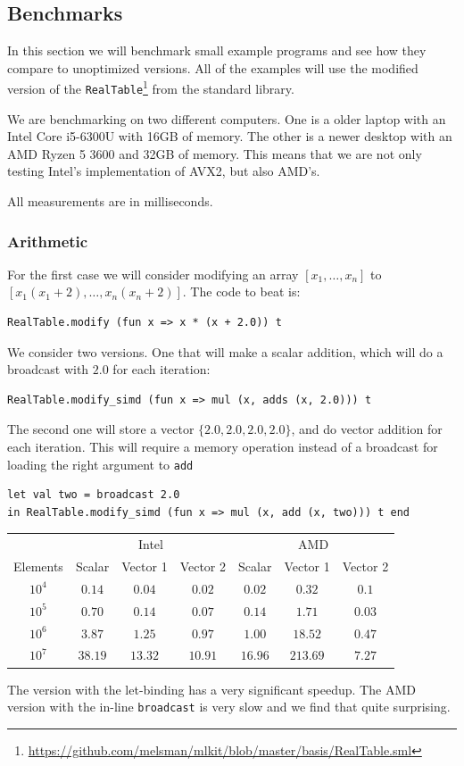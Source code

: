 \documentclass{article}
\begin{document}
\subsection{Benchmarks}

In this section we will benchmark small example programs and see how they compare to unoptimized versions. All of the examples will use the modified version of the \texttt{RealTable}\footnote{\url{https://github.com/melsman/mlkit/blob/master/basis/RealTable.sml}} from the standard library.
 
We are benchmarking on two different computers. One is a older laptop with an Intel Core i5-6300U with 16GB of memory. The other is a newer desktop with an AMD Ryzen 5 3600 and 32GB of memory. This means that we are not only testing Intel's implementation of AVX2, but also AMD's.

All measurements are in milliseconds.

\subsubsection{Arithmetic}

For the first case we will consider modifying an array $[x_1, \ldots, x_n]$ to $[x_1(x_1 + 2), \ldots, x_n(x_n + 2)]$. The code to beat is:
\begin{verbatim}
RealTable.modify (fun x => x * (x + 2.0)) t
\end{verbatim}
We consider two versions. One that will make a scalar addition, which will do a broadcast with $2.0$ for each iteration:
\begin{verbatim}
RealTable.modify_simd (fun x => mul (x, adds (x, 2.0))) t
\end{verbatim}
The second one will store a vector $\{ 2.0, 2.0, 2.0, 2.0 \}$, and do vector addition for each iteration. This will require a memory operation instead of a broadcast for loading the right argument to \verb!add!
\begin{verbatim}
let val two = broadcast 2.0
in RealTable.modify_simd (fun x => mul (x, add (x, two))) t end
\end{verbatim}
\begin{center}
\begin{tabular}{c c c c c c c}
    \toprule
    & \multicolumn{3}{c}{Intel} & \multicolumn{3}{c}{AMD} \\
    Elements & Scalar & Vector 1 & Vector 2 & Scalar & Vector 1 & Vector 2 \\
    \midrule
    $10^4$ & $0.14$ & $0.04$ & $0.02$ & $0.02$ & $0.32$ & $0.1$ \\
    $10^5$ & $0.70$ & $0.14$ & $0.07$ & $0.14$ & $1.71$ & $0.03$ \\
    $10^6$ & $3.87$ & $1.25$ & $0.97$ & $1.00$ & $18.52$ & $0.47$ \\
    $10^7$ & $38.19$ & $13.32$ & $10.91$ & $16.96$ & $213.69$ & $7.27$ \\
    \bottomrule
\end{tabular}
\end{center}
The version with the let-binding has a very significant speedup. The AMD version with the in-line \verb!broadcast! is very slow and we find that quite surprising.
\end{document}

